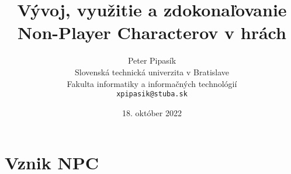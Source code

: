 \documentclass[10pt,twoside,slovak,a4paper]{article}
\title{Vývoj, využitie a zdokonaľovanie Non-Player Characterov v hrách}
\author{Peter Pipasík\\[2pt]
	{\small Slovenská technická univerzita v Bratislave}\\
	{\small Fakulta informatiky a informačných technológií}\\
	{\small \texttt{xpipasik@stuba.sk}}
	}
\date{\small 18. október 2022}
\begin{document}
\maketitle

\begin{abstract}

\end{abstract}


\section{Vznik NPC}
\end{document}
